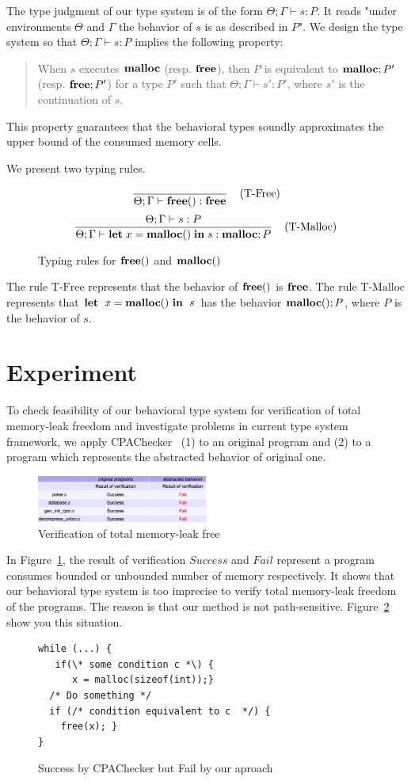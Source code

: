 \documentclass{sigplanconf}
\begin{document}
The type judgment of our type system is of the form $\Theta;\Gamma\vdash s :
P$.  It reads "under environments \(\Theta\) and  \(\Gamma\) the behavior
of \(s\) is as described in \(P\)".  We design the type system so that
\(\Theta;\Gamma \vdash s : P\) implies the following property:
\begin{quotation}
When \(s\) executes \(\mathbf{malloc}\) (resp. \(\mathbf{free}\)), then \(P\) is
equivalent to \(\mathbf{malloc};P'\) (resp. \(\mathbf{free};P'\)) for a type \(P'\)
such that \(\Theta;\Gamma \vdash s' : P'\), where \(s'\) is the continuation
of \(s\).
\end{quotation}
This property guarantees that the behavioral types soundly
approximates the upper bound of the consumed memory cells.

We present two typing rules. 
\begin{figure}[t]
$$ \frac{}
{\Theta;\Gamma \vdash \mathbf{free}() : \mathbf{free}} 
\; \; \; \; \mbox{(T-Free)} $$
$$ \frac{\Theta;\Gamma \vdash s : P}
{\Theta;\Gamma \vdash \mathbf{let}\; x = \mathbf{malloc()} \; \mathbf{in}\; s  : \mathbf{malloc};P} 
\; \; \; \; \mbox{(T-Malloc)} $$
\caption{Typing rules for $\mathbf{free}()$ and $\mathbf{malloc()}$ }
\end{figure}
The rule $\mbox{T-Free}$ represents that the behavior of \(\mathbf{free}()\)
is \(\mathbf{free}\). The rule $\mbox{T-Malloc}$ represents that \(\mathbf{let}\;\ x =
\mathbf{malloc()}\ \mathbf{in}\;\ s\) has the behavior \(\mathbf{malloc()};P\), where \(P\) is the
behavior of \(s\).

\section{Experiment}
To check feasibility of our behavioral type system for verification of
total memory-leak freedom and investigate problems in current type
system framework, we apply CPAChecker~\cite{beyer2011cpachecker} (1)
to an original program and (2) to a program which represents the
abstracted behavior of original one.

\begin{figure}[!hbp]
\centering
\includegraphics[width=0.5\textwidth]{exp.png} 
\caption{Verification of total memory-leak free}
\label{figexp} 
\end{figure}

In Figure~\ref{figexp}, the result of verification \(Success\) and
\(Fail\) represent a program consumes bounded or unbounded number of
memory respectively. It shows that our behavioral type system is too imprecise to
verify total memory-leak freedom of the programs. The reason is that
our method is not path-sensitive. Figure~\ref{ex:fail} show you this situation.
\begin{figure}[h]
\begin{verbatim}
while (...) {
   if(\* some condition c *\) {
      x = malloc(sizeof(int));}
  /* Do something */
  if (/* condition equivalent to c  */) {
    free(x); }
}
\end{verbatim}
\caption{Success by CPAChecker but Fail by our aproach}
\label{ex:fail}
\end{figure}
\end{document}
